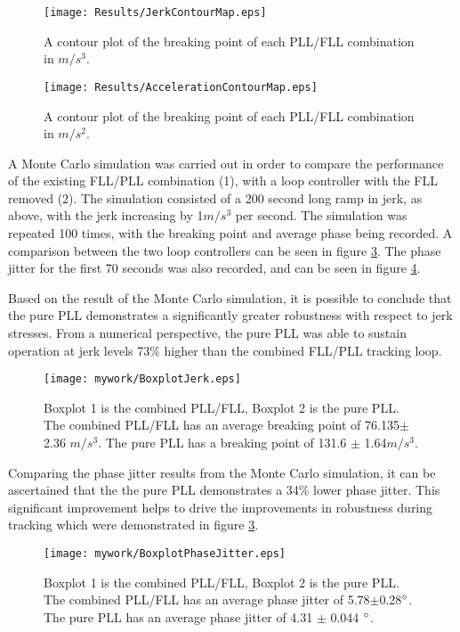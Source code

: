 \begin{figure}[!htb] 
    \centering
    \texttt{[image: Results/JerkContourMap.eps]} 
    \caption{A contour plot of the breaking point of each PLL/FLL combination in $m/s^3$.}
    \label{fig:JerkContourMap}
\end{figure}


\begin{figure}[!htb] 
    \centering
    \texttt{[image: Results/AccelerationContourMap.eps]} 
    \caption{A contour plot of the breaking point of each PLL/FLL combination in $m/s^2$.}
    \label{fig:AccelerationContourMap}
\end{figure}


A Monte Carlo simulation was carried out in order to compare the performance of the existing FLL/PLL combination (1), with a loop controller with the FLL removed (2). The simulation consisted of a 200 second long ramp in jerk, as above, with the jerk increasing by 1$m/s^3$ per second. The simulation was repeated 100 times, with the breaking point and average phase being recorded. A comparison between the two loop controllers can be seen in figure \ref{fig:BoxplotJerk}. The phase jitter for the first 70 seconds was also recorded, and can be seen in figure \ref{fig:BoxplotPhaseJitter}. 

Based on the result of the Monte Carlo simulation, it is possible to conclude that the pure PLL demonstrates a significantly greater robustness with respect to jerk stresses. From a numerical perspective, the pure PLL was able to sustain operation at jerk levels  73\% higher than the combined FLL/PLL tracking loop. 

\begin{figure}[!htb] 
    \centering
    \texttt{[image: mywork/BoxplotJerk.eps]} 
    \caption{Boxplot 1 is the combined PLL/FLL, Boxplot 2 is the pure PLL. The combined PLL/FLL has an average breaking point of 76.135$\pm$ 2.36 $m/s^3$. The pure PLL has a breaking point of 131.6 $\pm$ 1.64$m/s^3$.}
    \label{fig:BoxplotJerk}
\end{figure}

Comparing the phase jitter results from the Monte Carlo simulation, it can be ascertained that the the pure PLL demonstrates a 34\% lower phase jitter. This significant improvement helps to drive the improvements in robustness during tracking which were demonstrated in figure \ref{fig:BoxplotJerk}. 

\begin{figure}[!htb] 
    \centering
    \texttt{[image: mywork/BoxplotPhaseJitter.eps]} 
    \caption{Boxplot 1 is the combined PLL/FLL, Boxplot 2 is the pure PLL. The combined PLL/FLL has an average phase jitter of 5.78$\pm$0.28$\degree$. The pure PLL has an average phase jitter of 4.31 $\pm$ 0.044 $\degree$.}
    \label{fig:BoxplotPhaseJitter}
\end{figure}

